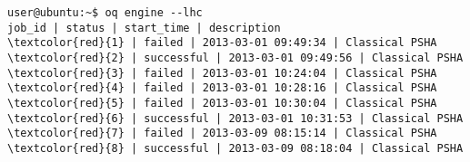 \begin{Verbatim}[frame=single, commandchars=\\\{\}, fontsize=\small]
user@ubuntu:~$ oq engine --lhc
job_id | status | start_time | description
\textcolor{red}{1} | failed | 2013-03-01 09:49:34 | Classical PSHA
\textcolor{red}{2} | successful | 2013-03-01 09:49:56 | Classical PSHA
\textcolor{red}{3} | failed | 2013-03-01 10:24:04 | Classical PSHA
\textcolor{red}{4} | failed | 2013-03-01 10:28:16 | Classical PSHA
\textcolor{red}{5} | failed | 2013-03-01 10:30:04 | Classical PSHA
\textcolor{red}{6} | successful | 2013-03-01 10:31:53 | Classical PSHA
\textcolor{red}{7} | failed | 2013-03-09 08:15:14 | Classical PSHA
\textcolor{red}{8} | successful | 2013-03-09 08:18:04 | Classical PSHA
\end{Verbatim}